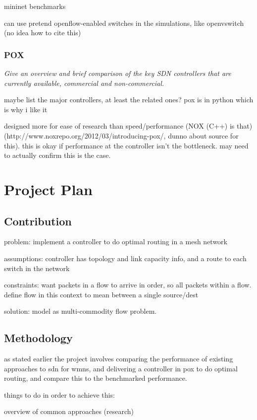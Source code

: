 \documentclass[pdftex,12pt,a4paper]{article}
\begin{document}
mininet benchmarks \cite{handigol:benchmarks}

can use pretend openflow-enabled switches in the simulations, like openvswitch (no idea how to cite this)

\subsubsection{POX}
\emph{Give an overview and brief comparison of the key SDN controllers that are currently available, commercial and non-commercial.}

maybe list the major controllers, at least the related ones? pox is in python which is why i like it

designed more for ease of research than speed/performance (NOX (C++) is that) (http://www.noxrepo.org/2012/03/introducing-pox/, dunno about source for this). this is okay if performance at the controller isn't the bottleneck. may need to actually confirm this is the case.

\newpage
\section{Project Plan}
\subsection{Contribution}
problem: implement a controller to do optimal routing in a mesh network

assumptions: controller has topology and link capacity info, and a route to each switch in the network

constraints: want packets in a flow to arrive in order, so all packets within a flow. define flow in this context to mean between a single source/dest

solution: model as multi-commodity flow problem.

\subsection{Methodology}

as stated earlier the project involves comparing the performance of existing approaches to sdn for wmns, and delivering a controller in pox to do optimal routing, and compare this to the benchmarked performance.

things to do in order to achieve this:

overview of common approaches (research)
\end{document}
